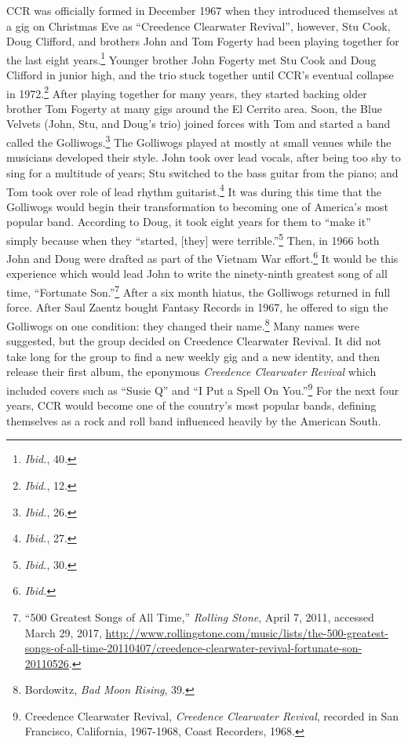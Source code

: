 \documentclass[10pt]{article}
\begin{document}
CCR was officially formed in December 1967 when they introduced themselves at a gig on Christmas Eve as ``Creedence Clearwater Revival'', however, Stu Cook, Doug Clifford, and brothers John and Tom Fogerty had been playing together for the last eight years.\footnote{\textit{Ibid.}, 40.} Younger brother John Fogerty met Stu Cook and Doug Clifford in junior high, and the trio stuck together until CCR's eventual collapse in 1972.\footnote{\textit{Ibid.}, 12.} After playing together for many years, they started backing older brother Tom Fogerty at many gigs around the El Cerrito area. Soon, the Blue Velvets (John, Stu, and Doug's trio) joined forces with Tom and started a band called the Golliwogs.\footnote{\textit{Ibid.}, 26.} The Golliwogs played at mostly at small venues while the musicians developed their style. John took over lead vocals, after being too shy to sing for a multitude of years; Stu switched to the bass guitar from the piano; and Tom took over role of lead rhythm guitarist.\footnote{\textit{Ibid.}, 27.} It was during this time that the Golliwogs would begin their transformation to becoming one of America's most popular band. According to Doug, it took eight years for them to ``make it'' simply because when they ``started, [they] were terrible.''\footnote{\textit{Ibid.}, 30.} Then, in 1966 both John and Doug were drafted as part of the Vietnam War effort.\footnote{\textit{Ibid.}} It would be this experience which would lead John to write the ninety-ninth greatest song of all time, ``Fortunate Son.''\footnote{``500 Greatest Songs of All Time,'' \textit{Rolling Stone}, April 7, 2011, accessed March 29, 2017, \url{http://www.rollingstone.com/music/lists/the-500-greatest-songs-of-all-time-20110407/creedence-clearwater-revival-fortunate-son-20110526}.} After a six month hiatus, the Golliwogs returned in full force. After Saul Zaentz bought Fantasy Records in 1967, he offered to sign the Golliwogs on one condition: they changed their name.\footnote{Bordowitz, \textit{Bad Moon Rising}, 39.} Many names were suggested, but the group decided on Creedence Clearwater Revival. It did not take long for the group to find a new weekly gig and a new identity, and then release their first album, the eponymous \textit{Creedence Clearwater Revival} which included covers such as ``Susie Q'' and ``I Put a Spell On You.''\footnote{Creedence Clearwater Revival, \textit{Creedence Clearwater Revival}, recorded in San Francisco, California, 1967-1968, Coast Recorders, 1968.} For the next four years, CCR would become one of the country's most popular bands, defining themselves as a rock and roll band influenced heavily by the American South.
\end{document}

